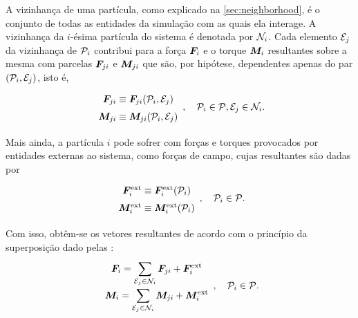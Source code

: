 A vizinhança de uma partícula, como explicado na \cref{sec:neighborhood}, é o conjunto de todas as entidades da simulação com as quais ela interage. A vizinhança da \(i\)-ésima partícula do sistema é denotada por \(\mathcal{N}_{i}\). Cada elemento \(\mathcal{E}_{j}\) da vizinhança de \(\particlei\) contribui para a força \(\bm{F}_{i}\) e o torque \(\bm{M}_{i}\) resultantes sobre a mesma com parcelas \({\bm{F}}_{j i}\) e \({\bm{M}}_{j i}\) que são, por hipótese, dependentes apenas do par \(\orderedPair{\particlei}{\elementj}\), isto é,
\begin{equation*}
	\def\arraystretch{1.5}
	\begin{array}{c}
		\displaystyle \forceji \equiv \forceji\pqty{\particlei, \elementj} \\
		\displaystyle \torqueji \equiv \torqueji\pqty{\particlei, \elementj} \\
	\end{array}, \quad \particlei \in \particleSet, \elementj \in \neighborhoodi.
\end{equation*}

Mais ainda, a partícula \(i\) pode sofrer com forças e torques provocados por entidades externas ao sistema, como forças de campo, cujas resultantes são dadas por
\begin{equation*}
	\def\arraystretch{1.5}
	\begin{array}{c}
		\external\forcei \equiv \external\forcei\pqty{\particlei} \\
		\external\torquei \equiv \external\torquei\pqty{\particlei} \\
	\end{array}, \quad \particlei \in \particleSet.
\end{equation*}
 
Com isso, obtêm-se os vetores resultantes de acordo com o princípio da superposição dado pelas  :
\begin{equation*}
	\def\arraystretch{1.5}
	\begin{array}{c}
		\resultingForcei = \dsum_{\elementj\in\neighborhoodi}\forceji + \external\forcei\\
		\resultingTorquei = \dsum_{\elementj\in\neighborhoodi}\torqueji + \external\torquei
	\end{array}, \quad \particlei\in\particleSet.
\end{equation*}


